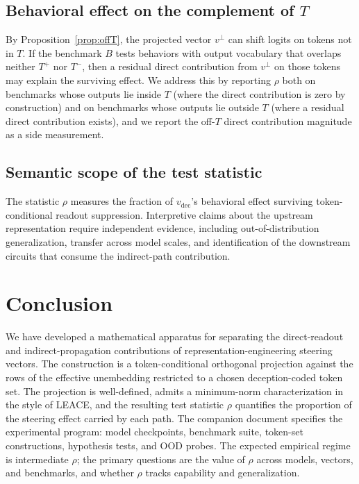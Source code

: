 \documentclass[11pt,letterpaper]{article}
\theoremstyle{plain}
\theoremstyle{definition}
\newcommand{\1}{\mathbf{1}}
\newcommand{\vdec}{v_{\text{dec}}}
\newcommand{\vperp}{v^{\perp}}
\begin{document}
\subsection{Behavioral effect on the complement of $T$}

By Proposition~\ref{prop:offT}, the projected vector $\vperp$ can shift logits on tokens not in $T$. If the benchmark $B$ tests behaviors with output vocabulary that overlaps neither $T^+$ nor $T^-$, then a residual direct contribution from $\vperp$ on those tokens may explain the surviving effect. We address this by reporting $\rho$ both on benchmarks whose outputs lie inside $T$ (where the direct contribution is zero by construction) and on benchmarks whose outputs lie outside $T$ (where a residual direct contribution exists), and we report the off-$T$ direct contribution magnitude as a side measurement.

\subsection{Semantic scope of the test statistic}

The statistic $\rho$ measures the fraction of $\vdec$'s behavioral effect surviving token-conditional readout suppression. Interpretive claims about the upstream representation require independent evidence, including out-of-distribution generalization, transfer across model scales, and identification of the downstream circuits that consume the indirect-path contribution.

\section{Conclusion}\label{sec:conclusion}

We have developed a mathematical apparatus for separating the direct-readout and indirect-propagation contributions of representation-engineering steering vectors. The construction is a token-conditional orthogonal projection against the rows of the effective unembedding restricted to a chosen deception-coded token set. The projection is well-defined, admits a minimum-norm characterization in the style of LEACE, and the resulting test statistic $\rho$ quantifies the proportion of the steering effect carried by each path. The companion document specifies the experimental program: model checkpoints, benchmark suite, token-set constructions, hypothesis tests, and OOD probes. The expected empirical regime is intermediate $\rho$; the primary questions are the value of $\rho$ across models, vectors, and benchmarks, and whether $\rho$ tracks capability and generalization.
\end{document}
